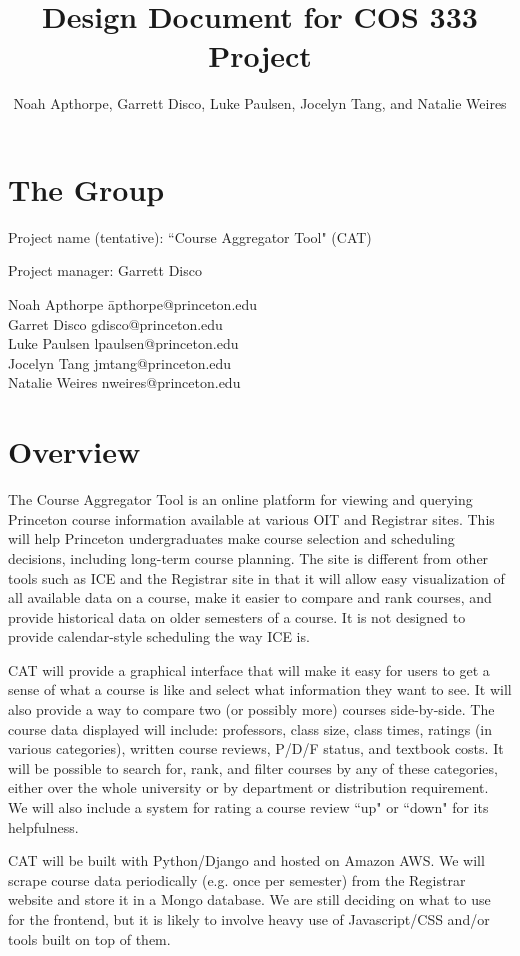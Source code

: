 \documentclass[11pt]{article}
\title{ Design Document for COS 333 Project }
\author{Noah Apthorpe, Garrett Disco, Luke Paulsen, Jocelyn Tang, and Natalie Weires}
\begin{document}
\maketitle

\section{The Group}
\par Project name (tentative): ``Course Aggregator Tool" (CAT)
\par Project manager: Garrett Disco
\begin{tabbing}
Noah Apthorpe\; \= apthorpe@princeton.edu \\
Garret Disco \> gdisco@princeton.edu \\
Luke Paulsen \> lpaulsen@princeton.edu \\
Jocelyn Tang \> jmtang@princeton.edu \\
Natalie Weires \> nweires@princeton.edu
\end{tabbing}

\section{Overview}
\par The Course Aggregator Tool is an online platform for viewing and querying Princeton course information available at various OIT and Registrar sites. This will help Princeton undergraduates make course selection and scheduling decisions, including long-term course planning. The site is different from other tools such as ICE and the Registrar site in that it will allow easy visualization of all available data on a course, make it easier to compare and rank courses, and provide historical data on older semesters of a course. It is not designed to provide calendar-style scheduling the way ICE is.
\par CAT will provide a graphical interface that will make it easy for users to get a sense of what a course is like and select what information they want to see. It will also provide a way to compare two (or possibly more) courses side-by-side. The course data displayed will include: professors, class size, class times, ratings (in various categories), written course reviews, P/D/F status, and textbook costs. It will be possible to search for, rank, and filter courses by any of these categories, either over the whole university or by department or distribution requirement. We will also include a system for rating a course review ``up" or ``down" for its helpfulness.
\par CAT will be built with Python/Django and hosted on Amazon AWS. We will scrape course data periodically (e.g. once per semester) from the Registrar website and store it in a Mongo database. We are still deciding on what to use for the frontend, but it is likely to involve heavy use of Javascript/CSS and/or tools built on top of them.
\end{document}
